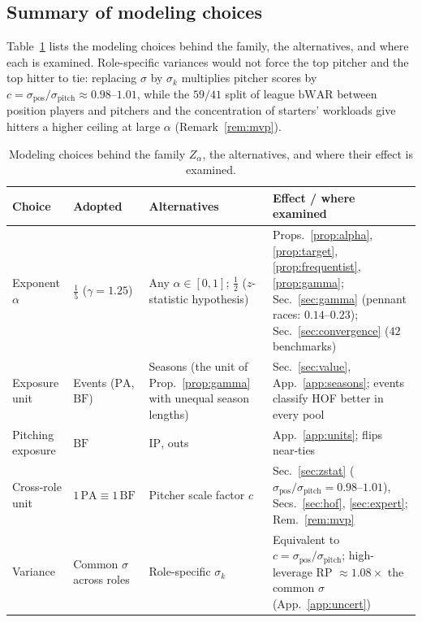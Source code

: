 \documentclass[11pt,letterpaper]{article}
\theoremstyle{plain}
\theoremstyle{definition}
\theoremstyle{remark}
\newcommand{\PA}{\mathrm{PA}}
\newcommand{\BF}{\mathrm{BF}}
\newcommand{\IP}{\mathrm{IP}}
\begin{document}
\subsection{Summary of modeling choices}

Table~\ref{tab:choices} lists the modeling choices behind the family, the alternatives, and where each is examined. Role-specific variances would not force the top pitcher and the top hitter to tie: replacing $\sigma$ by $\sigma_k$ multiplies pitcher scores by $c = \sigma_{\mathrm{pos}}/\sigma_{\mathrm{pitch}} \approx 0.98$--$1.01$, while the $59/41$ split of league $\mathrm{bWAR}$ between position players and pitchers and the concentration of starters' workloads give hitters a higher ceiling at large $\alpha$ (Remark~\ref{rem:mvp}).

\begin{table}[htbp]
\centering
\caption{Modeling choices behind the family $Z_\alpha$, the alternatives, and where their effect is examined.}
\label{tab:choices}
\footnotesize
\begin{tabular}{@{}>{\raggedright\arraybackslash}p{3.1cm}>{\raggedright\arraybackslash}p{3.6cm}>{\raggedright\arraybackslash}p{4.0cm}>{\raggedright\arraybackslash}p{3.6cm}@{}}
\toprule
\textbf{Choice} & \textbf{Adopted} & \textbf{Alternatives} & \textbf{Effect / where examined} \\
\midrule
Exponent $\alpha$ & $\tfrac15$ ($\gamma = 1.25$) & Any $\alpha\in[0,1]$; $\tfrac12$ ($z$-statistic hypothesis) & Props.~\ref{prop:alpha}, \ref{prop:target}, \ref{prop:frequentist}, \ref{prop:gamma}; Sec.~\ref{sec:gamma} (pennant races: $0.14$--$0.23$); Sec.~\ref{sec:convergence} ($42$ benchmarks) \\
Exposure unit & Events ($\PA$, $\BF$) & Seasons (the unit of Prop.~\ref{prop:gamma} with unequal season lengths) & Sec.~\ref{sec:value}, App.~\ref{app:seasons}; events classify HOF better in every pool \\
Pitching exposure & $\BF$ & $\IP$, outs & App.~\ref{app:units}; flips near-ties \\
Cross-role unit & $1\,\PA \equiv 1\,\BF$ & Pitcher scale factor $c$ & Sec.~\ref{sec:zstat} ($\sigma_{\mathrm{pos}}/\sigma_{\mathrm{pitch}} = 0.98$--$1.01$), Secs.~\ref{sec:hof}, \ref{sec:expert}; Rem.~\ref{rem:mvp} \\
Variance & Common $\sigma$ across roles & Role-specific $\sigma_k$ & Equivalent to $c = \sigma_{\mathrm{pos}}/\sigma_{\mathrm{pitch}}$; high-leverage RP $\approx 1.08\times$ the common $\sigma$ (App.~\ref{app:uncert}) \\

\end{tabular}
\end{table}
\end{document}
